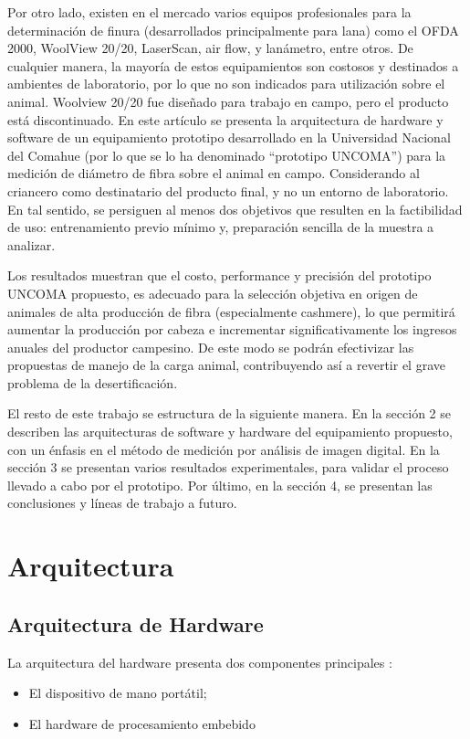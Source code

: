 \documentclass[runningheads,a4paper]{llncs}
\begin{document}
Por otro lado, existen en el mercado varios equipos profesionales para la determinación de finura (desarrollados principalmente para lana) como el OFDA 2000, WoolView 20/20, LaserScan, air flow, y lanámetro, entre otros. De cualquier manera, la mayoría de estos equipamientos son costosos y destinados a ambientes de laboratorio, por lo que no son indicados para utilización sobre el animal. Woolview 20/20 fue diseñado para trabajo en campo, pero el producto está discontinuado.
En este artículo se presenta la arquitectura de hardware y software de un equipamiento prototipo desarrollado en la Universidad Nacional del Comahue (por lo que se lo ha denominado ``prototipo UNCOMA'') para la medición de diámetro de fibra sobre el animal en campo. Considerando al criancero como destinatario del 
producto final, y no un entorno de laboratorio. En tal sentido, se persiguen al menos dos objetivos que 
resulten en la factibilidad de uso: entrenamiento previo mínimo y, preparación sencilla de la muestra a 
analizar.  
 
Los resultados muestran que el costo, performance y precisión del prototipo UNCOMA propuesto, es adecuado para la selección objetiva en origen de animales de alta producción de fibra (especialmente cashmere), lo que permitirá aumentar la producción por cabeza e incrementar significativamente los ingresos anuales del productor campesino. De este modo se podrán efectivizar las propuestas de manejo de la carga animal, contribuyendo así a revertir el grave problema de la desertificación.

El resto de este trabajo se estructura de la siguiente manera. En la sección 2 se describen
las arquitecturas de software y hardware del equipamiento propuesto, con un énfasis en
el método de medición por análisis de imagen digital. En la sección 3 se presentan varios
resultados experimentales, para validar el proceso llevado a cabo por el prototipo.
Por último, en la sección 4, se presentan las conclusiones y líneas de trabajo a futuro.

\section{Arquitectura}

\subsection{Arquitectura de Hardware}

La arquitectura del hardware presenta dos componentes principales :
\begin{itemize}
\item El dispositivo de mano portátil;
\item El hardware de procesamiento embebido
\end{itemize}
\end{document}
